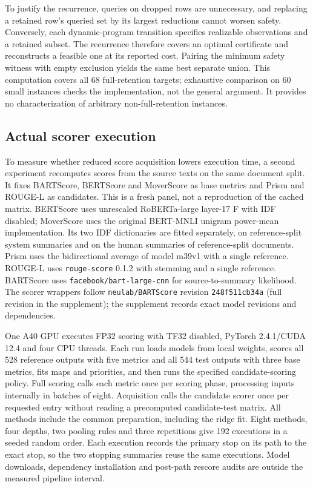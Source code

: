 To justify the recurrence, queries on dropped rows are unnecessary, and replacing a retained row's queried set by its largest reductions cannot worsen safety. Conversely, each dynamic-program transition specifies realizable observations and a retained subset. The recurrence therefore covers an optimal certificate and reconstructs a feasible one at its reported cost. Pairing the minimum safety witness with empty exclusion yields the same best separate union. This computation covers all 68 full-retention targets; exhaustive comparison on 60 small instances checks the implementation, not the general argument. It provides no characterization of arbitrary non-full-retention instances.

\subsection{Actual scorer execution}
\label{app:real-scoring}
To measure whether reduced score acquisition lowers execution time, a second experiment recomputes scores from the source texts on the same document split. It fixes BARTScore, BERTScore and MoverScore as base metrics and Prism and ROUGE-L as candidates. This is a fresh panel, not a reproduction of the cached matrix. BERTScore uses unrescaled RoBERTa-large layer-17 F with IDF disabled; MoverScore uses the original BERT-MNLI unigram power-mean implementation. Its two IDF dictionaries are fitted separately, on reference-split system summaries and on the human summaries of reference-split documents. Prism uses the bidirectional average of model m39v1 with a single reference. ROUGE-L uses \texttt{rouge-score} 0.1.2 with stemming and a single reference. BARTScore uses \texttt{facebook/bart-large-cnn} for source-to-summary likelihood. The scorer wrappers follow \texttt{neulab/BARTScore} revision \texttt{248f511cb34a} (full revision in the supplement); the supplement records exact model revisions and dependencies.

One A40 GPU executes FP32 scoring with TF32 disabled, PyTorch 2.4.1/CUDA 12.4 and four CPU threads. Each run loads models from local weights, scores all 528 reference outputs with five metrics and all 544 test outputs with three base metrics, fits maps and priorities, and then runs the specified candidate-scoring policy. Full scoring calls each metric once per scoring phase, processing inputs internally in batches of eight. Acquisition calls the candidate scorer once per requested entry without reading a precomputed candidate-test matrix. All methods include the common preparation, including the ridge fit. Eight methods, four depths, two pooling rules and three repetitions give 192 executions in a seeded random order. Each execution records the primary stop on its path to the exact stop, so the two stopping summaries reuse the same executions. Model downloads, dependency installation and post-path rescore audits are outside the measured pipeline interval.

